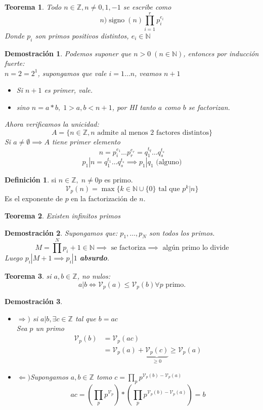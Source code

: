 \documentclass[9pt,a4paper,draft]{article}
\theoremstyle{definition}
\newtheorem{defi}{Definición}
\theoremstyle{plain}
\newtheorem{teo}{Teorema}
\newtheorem{demo}{Demostración}[teo]
\DeclareMathOperator{\sig}{signo}
\begin{document}
\begin{teo} \label{teofundamentalaritmetica} Todo $n\in{\mathbb{Z}}, n\neq{0,1,-1}$ se escribe como
$$n ) \sig(n)\prod_{i=1}^{r}p_i^{e_i}$$
Donde $p_i$ son primos positivos distintos, $e_i\in{\mathbb{N}}$
\end{teo}
\begin{demo}
Podemos suponer que $n>0 \; (n\in{\mathbb{N}})$, entonces por inducción fuerte:\\
$n=2=2^1$, supongamos que vale $i=1\dots n$, veamos $n+1$
\begin{itemize}
\item Si $n+1$ es primer, vale.
\item sino $n=a*b,\; 1>a, b<n+1$, por HI tanto $a$ como $b$ se factorizan.
\end{itemize}
Ahora verificamos la unicidad:\\
$$A=\{n\in{\mathbb{Z}}, n\text{ admite al menos 2 factores distintos}\}$$
Si $a\neq\emptyset\implies A$ tiene primer elemento
$$n = p_i^{e_1} \dots p_r^{e_r} = q_1^{t_q} \dots q_s^{t_s}$$
$$p_1|n = q_1^{t_1} \dots q_s^{t_s} \implies p_1|q_1 \text{ (alguno)}$$
\end{demo}

\begin{defi} si $n\in{\mathbb{Z}},\; n\neq 0 p$ es primo.
$$\mathcal{V}_p(n) = \max\{k\in{\mathbb{N}}\cup\{0\}\text{ tal que } p^k|n\}$$
Es el exponente de $p$ en la factorización de $n$.
\end{defi}

\begin{teo} Existen infinitos primos\end{teo}
\begin{demo}
Supongamos que: $p_1,\dots,p_N$ son todos los primos.
$$M = \prod^{N}p_i + 1 \in{\mathbb{N}}\implies\text{ se factoriza}\implies\text{ algún primo lo divide}$$
Luego $p_i | M + 1 \implies p_i|1$ {\bfseries absurdo}. 
\end{demo}

\begin{teo} si $a,b\in{\mathbb{Z}}$, no nulos:
$$ a|b \iff \mathcal{V}_p(a) \leq \mathcal{V}_p(b) \forall p \text{ primo.}$$
\end{teo}

\begin{demo}
\begin{itemize}
\item $\Rightarrow)$ si $a|b, \exists c \in{\mathbb{Z}}$ tal que $b=ac$ \\
Sea $p$ un primo 
\begin{align*}
\mathcal{V}_p(b) &= \mathcal{V}_p(ac) \\
&= \mathcal{V}_p(a) + \underbrace{\mathcal{V}_p(c)}_{\geq 0} \geq \mathcal{V}_p(a)
\end{align*}
\item $\Leftarrow)$Supongamos $a,b\in{\mathbb{Z}}$ tomo $c=\prod_{p}p^{\mathcal{V}_p(b)-\mathcal{V}_p(a)}$
$$ ac=(\prod_{p} p^{\mathcal{V}_p}) * (\prod_{p}p^{\mathcal{V}_p(b)-\mathcal{V}_p(a)}) = b$$
\end{itemize}
\end{demo}
\end{document}
